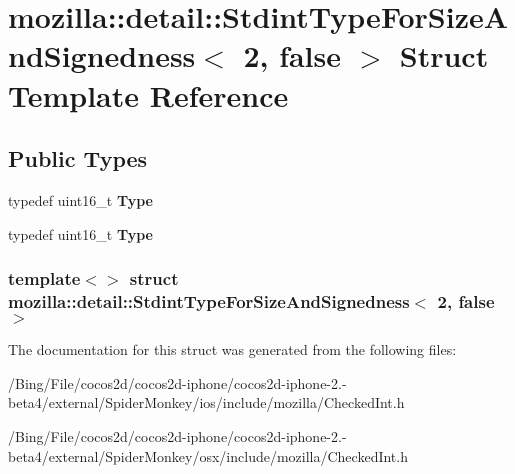 \hypertarget{structmozilla_1_1detail_1_1_stdint_type_for_size_and_signedness_3_012_00_01false_01_4}{\section{mozilla\-:\-:detail\-:\-:Stdint\-Type\-For\-Size\-And\-Signedness$<$ 2, false $>$ Struct Template Reference}
\label{structmozilla_1_1detail_1_1_stdint_type_for_size_and_signedness_3_012_00_01false_01_4}
}
\subsection*{Public Types}
\begin{DoxyCompactItemize}
\item 
\hypertarget{structmozilla_1_1detail_1_1_stdint_type_for_size_and_signedness_3_012_00_01false_01_4_a62ca4099bf56c477036f3049f3f576f3}{typedef uint16\-\_\-t {\bfseries Type}}\label{structmozilla_1_1detail_1_1_stdint_type_for_size_and_signedness_3_012_00_01false_01_4_a62ca4099bf56c477036f3049f3f576f3}

\item 
\hypertarget{structmozilla_1_1detail_1_1_stdint_type_for_size_and_signedness_3_012_00_01false_01_4_a62ca4099bf56c477036f3049f3f576f3}{typedef uint16\-\_\-t {\bfseries Type}}\label{structmozilla_1_1detail_1_1_stdint_type_for_size_and_signedness_3_012_00_01false_01_4_a62ca4099bf56c477036f3049f3f576f3}

\end{DoxyCompactItemize}
\subsubsection*{template$<$$>$ struct mozilla\-::detail\-::\-Stdint\-Type\-For\-Size\-And\-Signedness$<$ 2, false $>$}



The documentation for this struct was generated from the following files\-:\begin{DoxyCompactItemize}
\item 
/\-Bing/\-File/cocos2d/cocos2d-\/iphone/cocos2d-\/iphone-\/2.-\/beta4/external/\-Spider\-Monkey/ios/include/mozilla/Checked\-Int.\-h\item 
/\-Bing/\-File/cocos2d/cocos2d-\/iphone/cocos2d-\/iphone-\/2.-\/beta4/external/\-Spider\-Monkey/osx/include/mozilla/Checked\-Int.\-h\end{DoxyCompactItemize}
